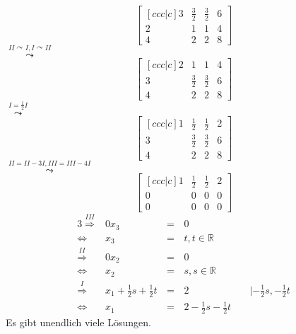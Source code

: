 \documentclass[10pt,a4paper,oneside,ngerman,numbers=noenddot]{scrartcl}
\begin{document}
\subsection{} %
\[
\begin{bmatrix}[ccc|c]
3 & \frac{3}{2} & \frac{3}{2} & 6 \\
2 & 1 & 1 & 4 \\
4 & 2 & 2 & 8
\end{bmatrix}
\]
$\overset{II \curvearrowright I, I \curvearrowright II}{\leadsto}$
\[
\begin{bmatrix}[ccc|c]
2 & 1 & 1 & 4 \\
3 & \frac{3}{2} & \frac{3}{2} & 6 \\
4 & 2 & 2 & 8
\end{bmatrix}
\]
$\overset{I = \frac{1}{2}I}{\leadsto}$
\[
\begin{bmatrix}[ccc|c]
1 & \frac{1}{2} & \frac{1}{2} & 2 \\
3 & \frac{3}{2} & \frac{3}{2} & 6 \\
4 & 2 & 2 & 8
\end{bmatrix}
\]
$\overset{II = II - 3I, III = III - 4I}{\leadsto}$
\[
\begin{bmatrix}[ccc|c]
1 & \frac{1}{2} & \frac{1}{2} & 2 \\
0 & 0 & 0 & 0 \\
0 & 0 & 0 & 0
\end{bmatrix}
\]
\begin{alignat*}{3}
\overset{III}{\Rightarrow} & 0x_{3} &\,=\,& 0 && \\
\Leftrightarrow & x_{3} &\,=\,& t, t \in \mathbb{R} && \\
\overset{II}{\Rightarrow} & 0x_{2} &\,=\,& 0 && \\
\Leftrightarrow & x_{2} &\,=\,& s, s \in \mathbb{R} && \\
\overset{I}{\Rightarrow} & x_{1} + \frac{1}{2}s + \frac{1}{2}t &\,=\,& 2 && \;|-\frac{1}{2}s, -\frac{1}{2}t \\
\Leftrightarrow & x_{1} &\,=\,& 2 - \frac{1}{2}s - \frac{1}{2}t  &&
\end{alignat*}
Es gibt unendlich viele Lösungen.
\end{document}
